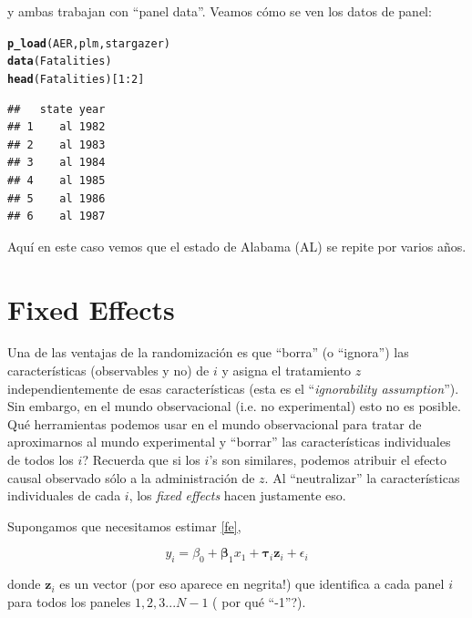 \documentclass[onesided]{article}\usepackage[]{graphicx}\usepackage[]{color}
\makeatletter
\newcommand{\hlnum}[1]{\textcolor[rgb]{0.686,0.059,0.569}{#1}}%
\newcommand{\hlopt}[1]{\textcolor[rgb]{0,0,0}{#1}}%
\newcommand{\hlstd}[1]{\textcolor[rgb]{0.345,0.345,0.345}{#1}}%
\newcommand{\hlkwd}[1]{\textcolor[rgb]{0.737,0.353,0.396}{\textbf{#1}}}%
\newenvironment{kframe}{%
 \def\at@end@of@kframe{}%
 \ifinner\ifhmode%
  \def\at@end@of@kframe{\end{minipage}}%
  \begin{minipage}{\columnwidth}%
 \fi\fi%
 \def\FrameCommand##1{\hskip\@totalleftmargin \hskip-\fboxsep
 \colorbox{shadecolor}{##1}\hskip-\fboxsep
     \hskip-\linewidth \hskip-\@totalleftmargin \hskip\columnwidth}%
 \MakeFramed {\advance\hsize-\width
   \@totalleftmargin\z@ \linewidth\hsize
   \@setminipage}}%
 {\par\unskip\endMakeFramed%
 \at@end@of@kframe}
\newenvironment{knitrout}{}{} %
\makeatother
\begin{document}
y ambas trabajan con ``panel data''. Veamos c\'omo se ven los datos de panel:

\begin{knitrout}
\color{fgcolor}\begin{kframe}
\begin{alltt}
\hlkwd{p_load}\hlstd{(AER, plm, stargazer)}
\hlkwd{data}\hlstd{(Fatalities)}
\hlkwd{head}\hlstd{(Fatalities)[}\hlnum{1}\hlopt{:}\hlnum{2}\hlstd{]}
\end{alltt}
\begin{verbatim}
##   state year
## 1    al 1982
## 2    al 1983
## 3    al 1984
## 4    al 1985
## 5    al 1986
## 6    al 1987
\end{verbatim}
\end{kframe}
\end{knitrout}

Aqu\'i en este caso vemos que el estado de Alabama (AL) se repite por varios a\~nos.


\section{Fixed Effects}

Una de las ventajas de la randomizaci\'on es que ``borra'' (o ``ignora'') las caracter\'isticas (observables y no) de $i$ y asigna el tratamiento $z$ independientemente de esas caracter\'isticas (esta es el ``\emph{ignorability assumption}''). Sin embargo, en el mundo observacional (i.e. no experimental) esto no es posible. Qu\'e herramientas podemos usar en el mundo observacional para tratar de aproximarnos al mundo experimental y ``borrar'' las caracter\'isticas individuales de todos los $i$? Recuerda que si los $i$'s son similares, podemos atribuir el efecto causal observado s\'olo a la administraci\'on de $z$. Al ``neutralizar'' la caracter\'isticas individuales de cada $i$, los \emph{fixed effects} hacen justamente eso. 

Supongamos que necesitamos estimar \autoref{fe}, 

\begin{equation}\label{fe}
y_{i} = \beta_{0} + {\mathbf \beta_{1}x_{1}} + {\boldsymbol \tau}_{i}{\mathbf z}_{i} + \epsilon_{i}
\end{equation}

donde ${\mathbf z}_{i}$ es un vector (por eso aparece en negrita!) que identifica a cada panel $i$ para todos los paneles $1, 2, 3...N-1$ ({\color{red} por qu\'e ``-1''?}). 
\end{document}

